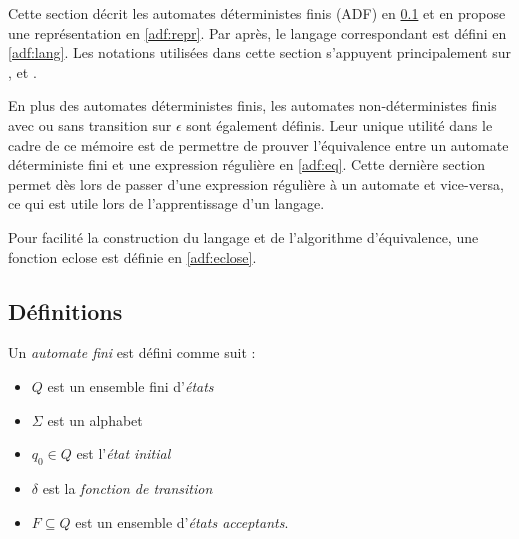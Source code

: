 Cette section décrit les automates déterministes finis (ADF) en \ref{adf:def} et en propose une représentation en \ref{adf:repr}. Par après, le langage correspondant est défini en \ref{adf:lang}.  Les notations utilisées dans cette section s'appuyent principalement sur \cite{Hopcroft79}, \cite{Hopcroft00} et \cite{Kozen97}.

En plus des automates déterministes finis, les automates non-déterministes finis avec ou sans transition sur $\epsilon$ sont également définis. Leur unique utilité dans le cadre de ce mémoire est de permettre de prouver l'équivalence entre un automate déterministe fini et une expression régulière en \ref{adf:eq}. Cette dernière section permet dès lors de passer d'une expression régulière à un automate et vice-versa, ce qui est utile lors de l'apprentissage d'un langage.

Pour facilité la construction du langage et de l'algorithme d'équivalence, une fonction eclose est définie en \ref{adf:eclose}.



\subsection{Définitions}\label{adf:def}

Un \emph{automate fini} \automaton est défini comme suit :
\begin{itemize}
  \item $Q$ est un ensemble fini d'\emph{états}
  \item $\Sigma$ est un alphabet
  \item $q_0 \in Q$ est l'\emph{état initial}
  \item $\delta$ est la \emph{fonction de transition}
  \item $F \subseteq Q$ est un ensemble d'\emph{états acceptants}.
\end{itemize}

